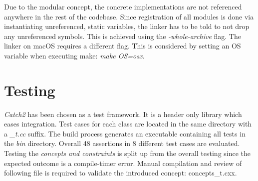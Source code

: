 Due to the modular concept, the concrete implementations are not referenced anywhere in the rest of the codebase. Since registration of all modules is done via instantiating unreferenced, static variables, the linker has to be told to not drop any unreferenced symbols. This is achieved using the \emph{-whole-archive} flag. The linker on macOS requires a different flag. This is considered by setting an OS variable when executing make: \emph{make OS=osx}.



\section{Testing}

\emph{Catch2}\autocite{Catch} has been chosen as a test framework. It is a header only library which eases integration. Test cases for each class are located in the same directory with a \emph{\_t.cc} suffix. The build process generates an executable containing all tests in the \emph{bin} directory. Overall 48 assertions in 8 different test cases are evaluated. 
Testing the \emph{concepts and constraints} is split up from the overall testing since the expected outcome is a compile-timer error. Manual compilation and review of following file is required to validate the introduced concept: concepts\_t.cxx.
